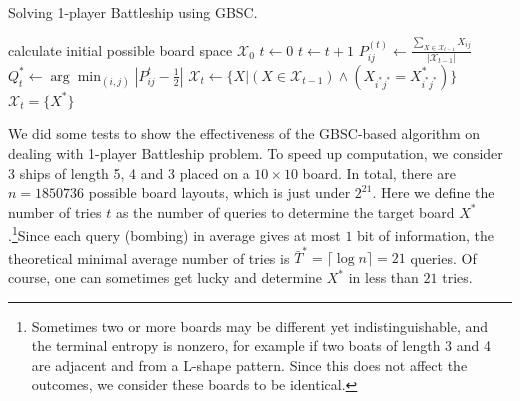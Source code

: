 \begin{algorithm}[H]
	\caption{Solving 1-player Battleship using GBSC.} 
	\begin{algorithmic}[1]
    \State calculate initial possible board space $\mathcal{X}_0$
    \State $t \gets 0$
        \State $t \gets t + 1$
        \State $P^{(t)}_{ij} \gets \frac{\sum_{X \in \mathcal{X}_{t-1}} X_{ij}}{|\mathcal{X}_{t-1}|}   $
        \State $Q^*_t \gets \arg\min_{(i,j)} |P^t_{ij} - \frac{1}{2}| $ 
        \State $\mathcal{X}_t \gets \{X|(X\in \mathcal{X}_{t-1}) \land (X_{i^*j^*} = X^{*}_{i^*j^*})\}$
    \EndWhile
    \State $\mathcal{X}_t = \{X^*\}$
	\end{algorithmic} 
	
\end{algorithm}




We did some tests to show the effectiveness of the GBSC-based algorithm on dealing with 1-player Battleship problem. To speed up computation, we consider 3 ships of length 5, 4 and 3 placed on a $10\times 10$ board. In total, there are $n=\num{1850736}$ possible board layouts, which is just under $2^{21}$. Here we define the number of tries $t$ as the number of queries to determine the target board $X^*$.\footnote{Sometimes two or more boards may be different yet indistinguishable, and the terminal entropy is nonzero, for example if two boats of length 3 and 4 are adjacent and from a L-shape pattern. Since this does not affect the outcomes, we consider these boards to be identical.}Since each query (bombing) in average gives at most $1$ bit of information,  the theoretical minimal average number of tries is $\bar{T}^* = \lceil \log n \rceil  = 21$ queries. Of course, one can sometimes get lucky and determine $X^*$ in less than $21$ tries.



